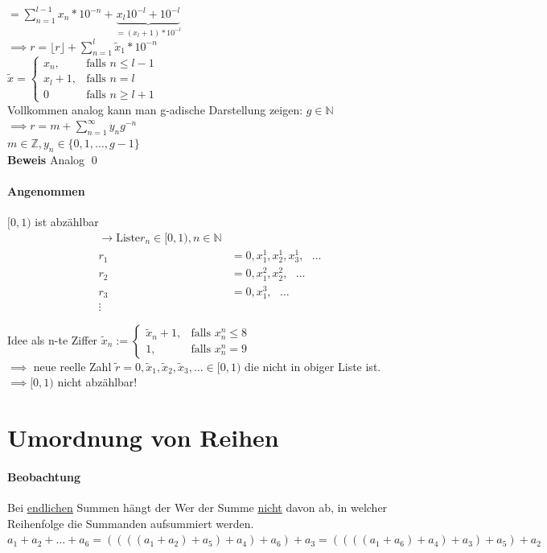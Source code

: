 \documentclass[fleqn]{scrbook}
\newcommand{\N}{\mathbb{N}}
\newcommand{\sumOI}{\sum_{n=1}^{\infty}}
\renewenvironment{proof}{{\bfseries Beweis }}{\qed}
\begin{document}
$=\sum_{n=1}^{l-1} x_n * 10^{-n} + \underbrace{x_l 10^{-l} + 10^{-l}}_{=(x_l + 1) * 10^{-l}}$\\
$\implies r = \lfloor r \rfloor + \sum_{n=1}^l \tilde{x}_1 * 10^{-n}$\\
$\tilde{x} = \left\{\begin{array}{cl} x_n, & \mbox{falls } n\leq l -1\\ x_l + 1, & \mbox{falls } n = l\\ 0 & \mbox{falls } n\geq l + 1 \end{array}\right. $\\
Vollkommen analog kann man g-adische Darstellung zeigen: $g \in\mathbb{N}$\\
$\implies r = m + \sumOI	y_n g^{-n}$\\
$m\in\mathbb{Z}, y_n \in\{ 0,1,\ldots ,g-1\}$\\
\begin{proof}
Analog
\end{proof}

\paragraph{Angenommen} $[0,1)$ ist abzählbar
\begin{equation}
\begin{split}
  \rightarrow \text{Liste} r_n \in [0,1), n\in \N \\
  r_1 &= 0, x_1^1, x_2^1, x_3^1, \text{ }\ldots \\
  r_2 &= 0, x_1^2, x_2^2, \text{ }\ldots \\
  r_3 &= 0, x_1^3, \text{ }\ldots \\
  \vdots
\end{split}
\end{equation}


Idee als n-te Ziffer $\tilde{x}_n := \left\{\begin{array}{cl} \tilde{x}_n + 1, & \mbox{falls } x_n^n \leq 8\\ 1, & \mbox{falls } x_n^n = 9 \end{array}\right. $\\
$\implies$ neue reelle Zahl $\tilde{r} = 0, \tilde{x}_1, \tilde{x}_2, \tilde{x}_3, \ldots \in [0,1)$ die nicht in obiger Liste ist.
$\implies [0,1)$ nicht abzählbar!

\section{Umordnung von Reihen}
\paragraph{Beobachtung} Bei \underline{endlichen} Summen hängt der Wer der Summe \underline{nicht} davon ab, in welcher Reihenfolge die Summanden aufsummiert werden.\\
$a_1 + a_2 + \ldots + a_6 = ((((a_1+a_2)+a_5)+a_4)+a_6)+a_3 = ((((a_1+a_6)+a_4)+a_3)+a_5)+a_2$
\end{document}
